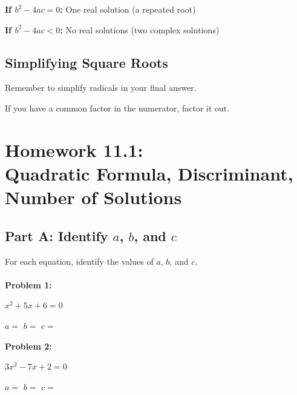 \documentclass[12pt]{article}
\begin{document}
			\textbf{If $b^2 - 4ac = 0$:} One real solution (a repeated root)

			\textbf{If $b^2 - 4ac < 0$:} No real solutions (two complex solutions)

		\subsection*{Simplifying Square Roots}

			Remember to simplify radicals in your final answer.

			If you have a common factor in the numerator, factor it out.

		\newpage

	\section*{Homework 11.1: \\ Quadratic Formula, Discriminant, Number of Solutions}

		\subsection*{Part A: Identify $a$, $b$, and $c$}

			For each equation, identify the values of $a$, $b$, and $c$.\\\\

			\textbf{Problem 1:}
            
            $x^2 + 5x + 6 = 0$

			\vspace{1.5cm}

			$a = $ \underline{\hspace{1in}} \quad $b = $ \underline{\hspace{1in}} \quad $c = $ \underline{\hspace{1in}}

			\vspace{1cm}

			\textbf{Problem 2:}
            
            $3x^2 - 7x + 2 = 0$

			\vspace{1.5cm}

			$a = $ \underline{\hspace{1in}} \quad $b = $ \underline{\hspace{1in}} \quad $c = $ \underline{\hspace{1in}}
\end{document}
